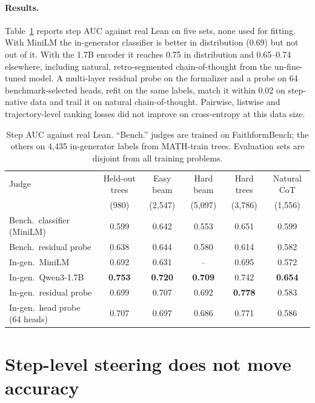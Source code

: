 \documentclass[10pt]{article}
\begin{document}
\paragraph{Results.} Table~\ref{tab:auc} reports step AUC against real Lean on five sets, none used for fitting. With MiniLM the in-generator classifier is better in distribution (0.69) but not out of it. With the 1.7B encoder it reaches 0.75 in distribution and 0.65--0.74 elsewhere, including natural, retro-segmented chain-of-thought from the un-fine-tuned model. A multi-layer residual probe on the formalizer and a probe on 64 benchmark-selected heads, refit on the same labels, match it within 0.02 on step-native data and trail it on natural chain-of-thought. Pairwise, listwise and trajectory-level ranking losses did not improve on cross-entropy at this data size.

\begin{table}[t]
\caption{Step AUC against real Lean. ``Bench.'' judges are trained on FaithformBench; the others on 4{,}435 in-generator labels from MATH-train trees. Evaluation sets are disjoint from all training problems.}\label{tab:auc}
\centering\small
\begin{tabular}{lccccc}
\toprule
Judge & Held-out trees & Easy beam & Hard beam & Hard trees & Natural CoT\\
 & (980) & (2{,}547) & (5{,}097) & (3{,}786) & (1{,}556)\\
\midrule
Bench.\ classifier (MiniLM) & 0.599 & 0.642 & 0.553 & 0.651 & 0.599\\
Bench.\ residual probe & 0.638 & 0.644 & 0.580 & 0.614 & 0.582\\
In-gen.\ MiniLM & 0.692 & 0.631 & -- & 0.695 & 0.572\\
In-gen.\ Qwen3-1.7B & \textbf{0.753} & \textbf{0.720} & \textbf{0.709} & 0.742 & \textbf{0.654}\\
In-gen.\ residual probe & 0.699 & 0.707 & 0.692 & \textbf{0.778} & 0.583\\
In-gen.\ head probe (64 heads) & 0.707 & 0.697 & 0.686 & 0.771 & 0.586\\
\bottomrule
\end{tabular}
\end{table}

\section{Step-level steering does not move accuracy}\label{sec:decoding}
\end{document}
